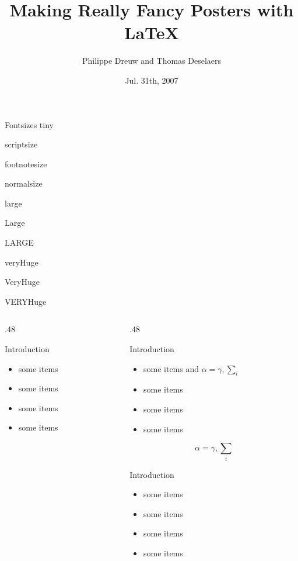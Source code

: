 \documentclass[final,unknownkeysallowed]{beamer}
\title[Fancy Posters]{Making Really Fancy Posters with \LaTeX}
\author[Dreuw \& Deselaers]{Philippe Dreuw and Thomas Deselaers}
\institute[RWTH Aachen University]{Human Language Technology and Pattern Recognition,RWTH Aachen University}
\date{Jul. 31th, 2007}
\begin{document}
  \begin{frame}{} 
    \vfill
    \begin{block}{\large Fontsizes}
      \centering
      {\tiny tiny}\par
      {\scriptsize scriptsize}\par
      {\footnotesize footnotesize}\par
      {\normalsize normalsize}\par
      {\large large}\par
      {\Large Large}\par
      {\LARGE LARGE}\par
      {\veryHuge veryHuge}\par
      {\VeryHuge VeryHuge}\par
      {\VERYHuge VERYHuge}\par
    \end{block}
    \vfill
    \begin{columns}[t]
      \begin{column}{.48\linewidth}
        \begin{block}{Introduction}
          \begin{itemize}
          \item some items
          \item some items
          \item some items
          \item some items
          \end{itemize}
        \end{block}
      \end{column}
      \begin{column}{.48\linewidth}
        \begin{block}{Introduction}
          \begin{itemize}
          \item some items and $\alpha=\gamma, \sum_{i}$
          \item some items
          \item some items
          \item some items
          \end{itemize}
          $$\alpha=\gamma, \sum_{i}$$
        \end{block}

        \begin{block}{Introduction}
          \begin{itemize}
          \item some items
          \item some items
          \item some items
          \item some items
          \end{itemize}
        \end{block}


\end{column}
\end{columns}
\end{frame}
\end{document}
